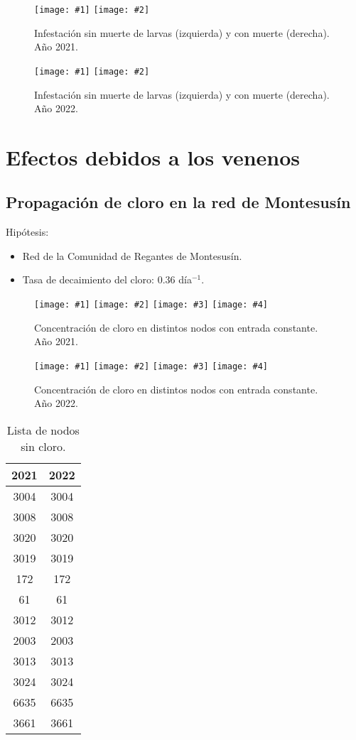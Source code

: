 \documentclass[a4paper]{article}
\newcommand{\FIGII}[4]
{
	\begin{figure}[ht!]
		\centering
		\texttt{[image: \#1]}
		\texttt{[image: \#2]}
		\caption{#3.\label{#4}}
	\end{figure}
}
\newcommand{\FIGIV}[6]
{
	\begin{figure}[ht!]
		\centering
		\texttt{[image: \#1]}
		\texttt{[image: \#2]}
		\texttt{[image: \#3]}
		\texttt{[image: \#4]}
		\caption{#5.\label{#6}}
	\end{figure}
}
\begin{document}
\FIGII{2021-mussel-constant.pdf}{2021-mussel-death.pdf}{Infestación sin muerte
de larvas (izquierda) y con muerte (derecha). Año 2021}{Fig2021MusselDeath}

\FIGII{2022-mussel-constant.pdf}{2022-mussel-death.pdf}{Infestación sin muerte
de larvas (izquierda) y con muerte (derecha). Año 2022}{Fig2022MusselDeath}

\clearpage
\section{Efectos debidos a los venenos}

\subsection{Propagación de cloro en la red de Montesusín}

Hipótesis:
\begin{itemize}
\item Red de la Comunidad de Regantes de Montesusín.
\item Tasa de decaimiento del cloro: 0.36 día$^{-1}$.
\end{itemize}

\FIGIV{2021-chlorine-constant-0.eps}{2021-chlorine-constant-2.eps}
{2021-chlorine-constant-6665.eps}{2021-chlorine-constant-172.eps}
{Concentración de cloro en distintos nodos con entrada constante. Año 2021}
{Fig2021ChlorineConstant}

\FIGIV{2022-chlorine-constant-0.eps}{2022-chlorine-constant-2.eps}
{2022-chlorine-constant-68.eps}{2022-chlorine-constant-172.eps}
{Concentración de cloro en distintos nodos con entrada constante. Año 2022}
{Fig2022ChlorineConstant}

\begin{table}[ht!]
	\centering
	\caption{Lista de nodos sin cloro.\label{TabWithoutChlorine}}
	\begin{tabular}{cc}
		2021 & 2022 \\
		\hline
                3004 & 3004 \\
		3008 & 3008 \\
		3020 & 3020 \\
		3019 & 3019 \\
		172 & 172 \\
		61 & 61 \\
		3012 & 3012 \\
		2003 & 2003 \\
		3013 & 3013 \\
		3024 & 3024 \\
		6635 & 6635 \\
		3661 & 3661
	\end{tabular}	
\end{table}
\end{document}
